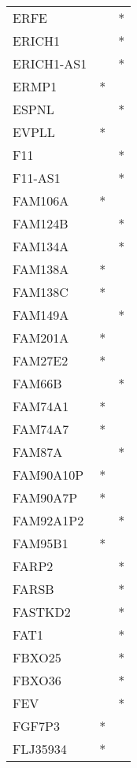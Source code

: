 \begin{longtable}{lcc}
ERFE           &           &       * \\
ERICH1         &           &       * \\
ERICH1-AS1     &           &       * \\
ERMP1          &         * &         \\
ESPNL          &           &       * \\
EVPLL          &         * &         \\
F11            &           &       * \\
F11-AS1        &           &       * \\
FAM106A        &         * &         \\
FAM124B        &           &       * \\
FAM134A        &           &       * \\
FAM138A        &         * &         \\
FAM138C        &         * &         \\
FAM149A        &           &       * \\
FAM201A        &         * &         \\
FAM27E2        &         * &         \\
FAM66B         &           &       * \\
FAM74A1        &         * &         \\
FAM74A7        &         * &         \\
FAM87A         &           &       * \\
FAM90A10P      &         * &         \\
FAM90A7P       &         * &         \\
FAM92A1P2      &           &       * \\
FAM95B1        &         * &         \\
FARP2          &           &       * \\
FARSB          &           &       * \\
FASTKD2        &           &       * \\
FAT1           &           &       * \\
FBXO25         &           &       * \\
FBXO36         &           &       * \\
FEV            &           &       * \\
FGF7P3         &         * &         \\
FLJ35934       &         * &         \\

\end{longtable}
